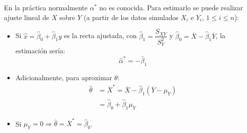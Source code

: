 \documentclass[
  spanish,
  10pt,
]{book}
\theoremstyle{break}
\theoremstyle{nonumberplain}
\begin{document}
En la práctica normalmente \(\alpha^{\ast}\) no es conocida.
Para estimarlo se puede realizar ajuste lineal de \(X\) sobre \(Y\)
(a partir de los datos simulados \(X_{i}\) e \(Y_{i}\), \(1\leq i\leq n\)):

\begin{itemize}
\item
  Si \(\hat{x}=\hat{\beta}_{0}+\hat{\beta}_{1}y\) es la recta ajustada, con
  \(\hat{\beta}_{1} = \dfrac{S_{XY}}{S_{Y}^{2}}\) y
  \(\hat{\beta}_{0} = \overline{X}-\hat{\beta}_{1}\overline{Y}\),
  la estimación sería:
  \[\hat{\alpha}^{\ast}=-\hat{\beta}_{1}\]
\item
  Adicionalmente, para aproximar \(\theta\):
  \[\begin{aligned}
  \hat{\theta} & =\overline{X}^{\ast}=\overline{X}-\hat{\beta}_{1}\left( \overline{Y}-\mu_{Y}\right) \\  
  & =\hat{\beta}_{0}+\hat{\beta}_{1}\mu_{Y}
  \end{aligned}\]
\item
  Si \(\mu_{Y}=0\Rightarrow \hat{\theta}=\overline{X}^{\ast}=\hat{\beta}_{0}\).
\end{itemize}
\end{document}
